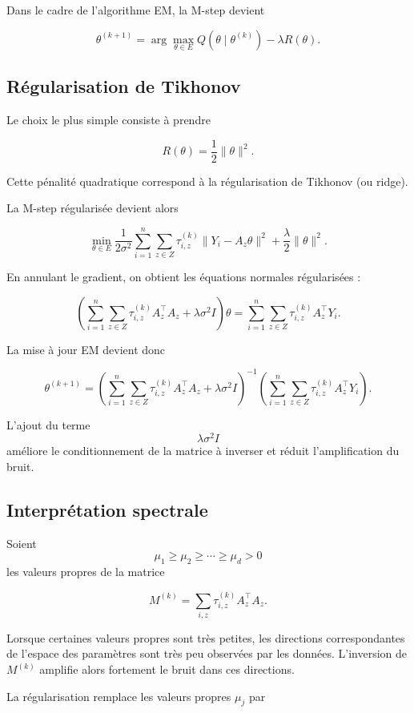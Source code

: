 \documentclass[12pt, a4paper]{article}
\theoremstyle{definition}
\begin{document}
Dans le cadre de l’algorithme EM, la M-step devient

\[
\theta^{(k+1)}
=
\arg\max_{\theta\in E}
Q(\theta\mid\theta^{(k)})
-\lambda R(\theta).
\]

\subsection{Régularisation de Tikhonov}

Le choix le plus simple consiste à prendre

\[
R(\theta)=\frac12\|\theta\|^2.
\]

Cette pénalité quadratique correspond à la régularisation de Tikhonov (ou ridge).

La M-step régularisée devient alors

\[
\min_{\theta\in E}
\frac1{2\sigma^2}
\sum_{i=1}^n
\sum_{z\in Z}
\tau_{i,z}^{(k)}
\|Y_i-A_z\theta\|^2
+
\frac{\lambda}{2}\|\theta\|^2.
\]

En annulant le gradient, on obtient les équations normales régularisées :

\[
\left(
\sum_{i=1}^n
\sum_{z\in Z}
\tau_{i,z}^{(k)}
A_z^\top A_z
+
\lambda\sigma^2 I
\right)\theta
=
\sum_{i=1}^n
\sum_{z\in Z}
\tau_{i,z}^{(k)}
A_z^\top Y_i.
\]

La mise à jour EM devient donc

\[
\theta^{(k+1)}
=
\left(
\sum_{i=1}^n
\sum_{z\in Z}
\tau_{i,z}^{(k)}
A_z^\top A_z
+
\lambda\sigma^2 I
\right)^{-1}
\left(
\sum_{i=1}^n
\sum_{z\in Z}
\tau_{i,z}^{(k)}
A_z^\top Y_i
\right).
\]

L’ajout du terme
\[
\lambda\sigma^2 I
\]
améliore le conditionnement de la matrice à inverser et réduit l’amplification du bruit.

\subsection{Interprétation spectrale}

Soient
\[
\mu_1\geq \mu_2\geq \cdots \geq \mu_d>0
\]
les valeurs propres de la matrice

\[
M^{(k)}
=
\sum_{i,z}\tau_{i,z}^{(k)}A_z^\top A_z.
\]

Lorsque certaines valeurs propres sont très petites, les directions correspondantes de l’espace des paramètres sont très peu observées par les données. L’inversion de $M^{(k)}$ amplifie alors fortement le bruit dans ces directions.

La régularisation remplace les valeurs propres $\mu_j$ par
\end{document}
